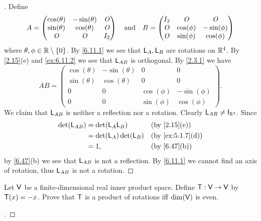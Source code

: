 \begin{proof}[]
  Define
  \[
    A = \begin{pmatrix}
      \cos(\theta) & -\sin(\theta) & \mathit{O} \\
      \sin(\theta) & \cos(\theta)  & \mathit{O} \\
      \mathit{O}          & \mathit{O}           & I_2
    \end{pmatrix} \quad \text{and} \quad B = \begin{pmatrix}
      I_2 & \mathit{O}        & \mathit{O}         \\
      \mathit{O} & \cos(\phi) & -\sin(\phi) \\
      \mathit{O} & \sin(\phi) & \cos(\phi)
    \end{pmatrix}
  \]
  where \(\theta, \phi \in \mathbb{R} \setminus \left\lbrace0\right\rbrace\).
  By \cref{6.11.1} we see that \(\mathsf{L}_A, \mathsf{L}_B\) are rotations on \(\mathbb{R}^4\).
  By \cref{2.15}(e) and \cref{ex:6.11.2} we see that \(\mathsf{L}_{AB}\) is orthogonal.
  By \cref{2.3.1} we have
  \[
    AB = \begin{pmatrix}
      \cos(\theta) & -\sin(\theta) & 0          & 0           \\
      \sin(\theta) & \cos(\theta)  & 0          & 0           \\
      0            & 0             & \cos(\phi) & -\sin(\phi) \\
      0            & 0             & \sin(\phi) & \cos(\phi)
    \end{pmatrix}.
  \]
  We claim that \(\mathsf{L}_{AB}\) is neither a reflection nor a rotation.
  Clearly \(\L_{AB} \neq \IT[\R^4]\).
  Since
  \begin{align*}
    \det(\L_{AB}) & = \det(\L_A \L_B)       &  & \by{2.15}[e]     \\
                  & = \det(\L_A) \det(\L_B) &  & \by{ex:5.1.7}[d] \\
                  & = 1,                    &  & \by{6.47}[b]
  \end{align*}
  by \cref{6.47}(b) we see that \(\mathsf{L}_{AB}\) is not a reflection.
  By \cref{6.11.1} we cannot find an axis of rotation, thus \(\mathsf{L}_{AB}\) is not a rotation.
\end{proof}

\begin{ex}\label{ex:6.11.12}
  Let \(\mathsf{V}\) be a finite-dimensional real inner product space.
  Define \(\mathsf{T} : \mathsf{V} \to \mathsf{V}\) by \(\mathsf{T}(x) = -x\).
  Prove that \(\mathsf{T}\) is a product of rotations iff \(\dim(\mathsf{V})\) is even.
\end{ex}

\begin{proof}[]

\end{proof}

